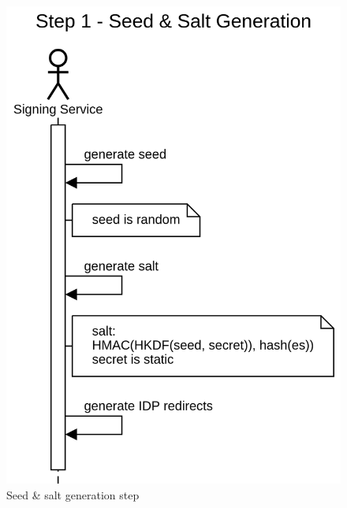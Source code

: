 \begin{figure}[H]
    \begin{center}
        \includegraphics[scale=0.5]{images/protocol_step1_seed_generation.png}
        \caption{Seed \& salt generation step}
        \label{fig:seedgenerationstep}
    \end{center}
\end{figure}

